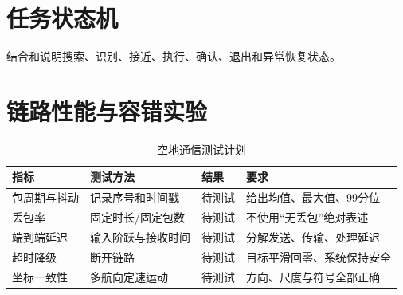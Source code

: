 \section{任务状态机}

结合和说明搜索、识别、接近、执行、确认、退出和异常恢复状态。


\section{链路性能与容错实验}

\begin{table}[htbp]
  \centering
  \caption{空地通信测试计划}
  \begin{tabularx}{\textwidth}{p{3.1cm}p{3.2cm}p{3.1cm}X}
    \toprule
    指标 & 测试方法 & 结果 & 要求 \\
    \midrule
    包周期与抖动 & 记录序号和时间戳 & 待测试 & 给出均值、最大值、99分位 \\
    丢包率 & 固定时长/固定包数 & 待测试 & 不使用“无丢包”绝对表述 \\
    端到端延迟 & 输入阶跃与接收时间 & 待测试 & 分解发送、传输、处理延迟 \\
    超时降级 & 断开链路 & 待测试 & 目标平滑回零、系统保持安全 \\
    坐标一致性 & 多航向定速运动 & 待测试 & 方向、尺度与符号全部正确 \\
    \bottomrule
  \end{tabularx}
\end{table}
